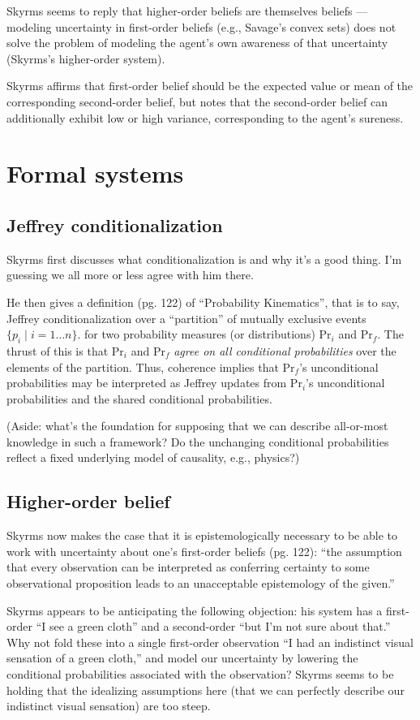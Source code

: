 \documentclass[letterpaper,12pt]{article}
\newcommand{\Prob}{\text{Pr}}
\begin{document}
Skyrms seems to reply that higher-order beliefs are themselves beliefs --- modeling uncertainty in first-order beliefs (e.g., Savage's convex sets) does not solve the problem of modeling the agent's own awareness of that uncertainty (Skyrms's higher-order system).

Skyrms affirms that first-order belief should be the expected value or mean of the corresponding second-order belief, but notes that the second-order belief can additionally exhibit low or high variance, corresponding to the agent's sureness.

\section{Formal systems}
\subsection{Jeffrey conditionalization}
Skyrms first discusses what conditionalization is and why it's a good thing. I'm guessing we all more or less agree with him there.

He then gives a definition (pg. 122) of ``Probability Kinematics'', that is to say, Jeffrey conditionalization over a ``partition'' of mutually exclusive events $\{p_i \mid i = 1 \ldots n \}$. for two probability measures (or distributions) $\Prob_i$ and $\Prob_f$. The thrust of this is that $\Prob_i$ and $\Prob_f$ \emph{agree on all conditional probabilities} over the elements of the partition. Thus, coherence implies that $\Prob_f$'s unconditional probabilities may be interpreted as Jeffrey updates from $\Prob_i$'s unconditional probabilities and the shared conditional probabilities.

(Aside: what's the foundation for supposing that we can describe all-or-most knowledge in such a framework? Do the unchanging conditional probabilities reflect a fixed underlying model of causality, e.g., physics?)
\subsection{Higher-order belief}
Skyrms now makes the case that it is epistemologically necessary to be able to work with uncertainty about one's first-order beliefs (pg. 122): ``the assumption that every observation can be interpreted as conferring certainty to some observational proposition leads to an unacceptable epistemology of the given.''

Skyrms appears to be anticipating the following objection: his system has a first-order ``I see a green cloth'' and a second-order ``but I'm not sure about that.'' Why not fold these into a single first-order observation ``I had an indistinct visual sensation of a green cloth,'' and model our uncertainty by lowering the conditional probabilities associated with the observation? Skyrms seems to be holding that the idealizing assumptions here (that we can perfectly describe our indistinct visual sensation) are too steep.
\end{document}
